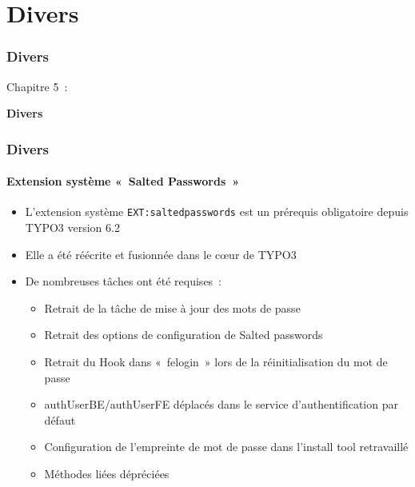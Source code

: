 %

\section{Divers}
\begin{frame}[fragile]
	\frametitle{Divers}

	\begin{center}\huge{Chapitre 5~:}\end{center}
	\begin{center}\huge{\color{typo3darkgrey}\textbf{Divers}}\end{center}

\end{frame}

%

\begin{frame}[fragile]
	\frametitle{Divers}
	\framesubtitle{Extension système «~Salted Passwords~»}

	\begin{itemize}
        \item L'extension système \texttt{EXT:saltedpasswords} est un
        	prérequis obligatoire depuis TYPO3 version 6.2
		\item Elle a été réécrite et fusionnée dans le cœur de TYPO3

		\item De nombreuses tâches ont été requises~:

			\begin{itemize}
		        \item Retrait de la tâche de mise à jour des mots de passe
				\item Retrait des options de configuration de Salted passwords
				\item Retrait du Hook dans «~felogin~» lors de la réinitialisation du mot de passe
				\item authUserBE/authUserFE déplacés dans le service d'authentification par défaut
				\item Configuration de l'empreinte de mot de passe dans l'install tool retravaillé
				\item Méthodes liées dépréciées
			\end{itemize}

	\end{itemize}

\end{frame}

